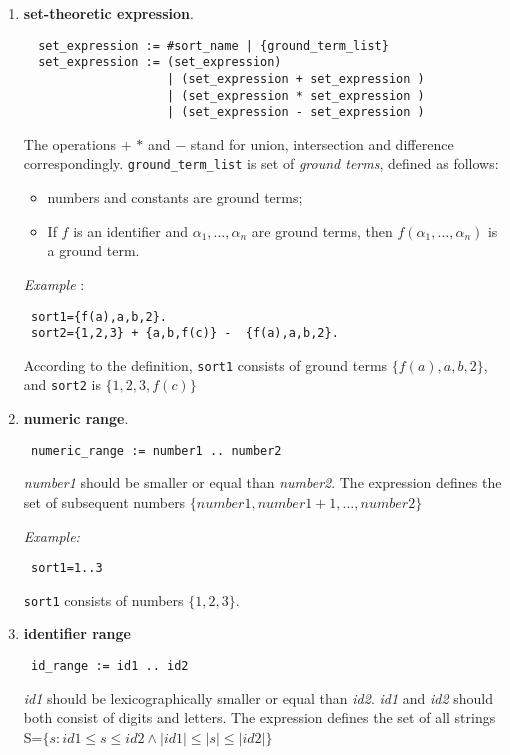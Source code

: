 \documentclass[12pt, letterpaper]{article}
\begin{document}
\begin{enumerate}
 \item \textbf{set-theoretic expression}.
 \begin{verbatim}
  set_expression := #sort_name | {ground_term_list}
  set_expression := (set_expression) 
                    | (set_expression + set_expression ) 
                    | (set_expression * set_expression ) 
                    | (set_expression - set_expression )
  \end{verbatim}
The operations $+$ $*$ and $-$ stand for union, intersection and difference correspondingly.
\texttt{ground\_term\_list} is set of \textit{ground terms}, defined as follows:
\begin{itemize}
 \item numbers and constants are ground terms;
 \item If $f$ is an identifier and $\alpha_1, \dots, \alpha_n$ are ground terms, then $f(\alpha_1,\dots, \alpha_n)$ is a ground term.
\end{itemize}
\textit{Example} : 
\begin{verbatim}
 sort1={f(a),a,b,2}.
 sort2={1,2,3} + {a,b,f(c)} -  {f(a),a,b,2}.
\end{verbatim}
According to the definition, \texttt{sort1} consists of ground terms $\{f(a),a,b,2\}$, and \texttt{sort2} is $\{1,2,3,f(c)\}$ 

\item \textbf{numeric range}.
\begin{verbatim}
 numeric_range := number1 .. number2
\end{verbatim}

\textit{number1} should be smaller or equal than \textit{number2}. The expression defines the set 
of subsequent numbers $\{number1, number1+1, \dots, number2\}$

\textit{Example:}

\begin{verbatim}
 sort1=1..3
\end{verbatim}
\texttt{sort1} consists of numbers $\{1,2,3\}$.


\item \textbf{identifier range}


\begin{verbatim}
 id_range := id1 .. id2
\end{verbatim}

\textit{id1} should be lexicographically smaller or equal than \textit{id2}. 
\textit{id1} and \textit{id2} should both consist of digits and letters.
The expression defines the set of all strings \\ S=$\{s: id1\leq s \leq id2 \land |id1|\leq |s| \leq |id2|\}$




\end{enumerate}
\end{document}
